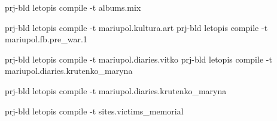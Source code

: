 
 
 
 
 

prj-bld letopis compile -t albums.mix

prj-bld letopis compile -t mariupol.kultura.art
prj-bld letopis compile -t mariupol.fb.pre_war.1

prj-bld letopis compile -t mariupol.diaries.vitko
prj-bld letopis compile -t mariupol.diaries.krutenko_maryna

prj-bld letopis compile -t mariupol.diaries.krutenko_maryna

prj-bld letopis compile -t sites.victims_memorial
